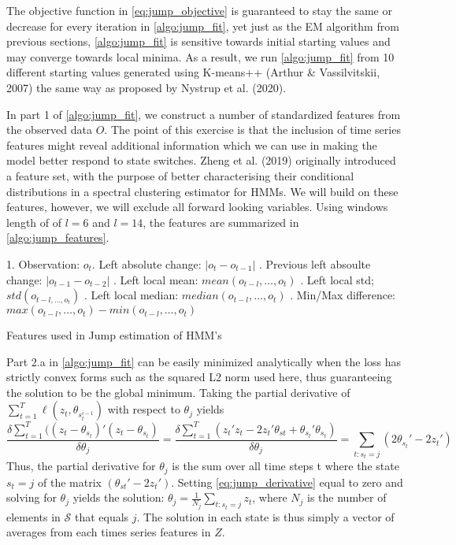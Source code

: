 The objective function in \cref{eq:jump_objective} is guaranteed to stay the same or decrease for every iteration in \cref{algo:jump_fit}, yet just as the EM algorithm from previous sections, \cref{algo:jump_fit} is sensitive towards initial starting values and may converge towards local minima. As a result, we run \cref{algo:jump_fit} from 10 different starting values generated using K-means++ (Arthur \& Vassilvitskii, 2007) the same way as proposed by Nystrup et al. (2020).

In part 1 of \cref{algo:jump_fit}, we construct a number of standardized features from the observed data $O$. The point of this exercise is that the inclusion of time series features might reveal additional information which we can use in making the model better respond to state switches. Zheng et al. (2019) originally introduced a feature set, with the purpose of better characterising their conditional distributions in a spectral clustering estimator for HMMs. We will build on these features, however, we will exclude all forward looking variables. Using windows length of of $l=6$ and $l=14$, the features are summarized in \cref{algo:jump_features}.

\begin{algorithm}[H]

\BlankLine

1. Observation: $o_t$. Left absolute change: $|o_t-o_{t-1}|$ . Previous left absoulte change: $|o_{t-1}-o_{t-2}|$ . Left local mean: $mean(o_{t-l},\ldots,o_{t})$ . Left local std; $std(o_{t-l,\ldots, o_{t}})$ . Left local median: $median(o_{t-l},\ldots,o_{t})$ . Min/Max difference: $max(o_{t-l},\ldots,o_{t}) - min(o_{t-l},\ldots,o_{t})$ \;
\BlankLine



\caption{Features used in Jump estimation of HMM's}
\label{algo:jump_features}
\end{algorithm}

Part 2.a in \cref{algo:jump_fit} can be easily minimized analytically when the loss has strictly convex forms such as the squared L2 norm used here, thus guaranteeing the solution to be the global minimum. Taking the partial derivative of $\sum_{t=1}^T \ell(z_t, \theta_{s_t^{i-1}})$ with respect to $\theta_j$ yields
\begin{equation}
   \frac{\delta \sum_{t=1}^{T} ((z_t-\theta_{s_t})'(z_t-\theta_{s_t}) }{\delta \theta_j}
   = \frac{\delta \sum_{t=1}^T (z_t'z_t - 2z_t'\theta_{st}+ \theta_{s_t}'\theta_{s_t} )}{\delta  \theta_j}
   = \sum_{t:s_t=j} ( 2\theta_{s_t}' - 2z_t' )
\label{eq:jump_derivative}
\end{equation}
Thus, the partial derivative for $\theta_j$ is the sum over all time steps t where the state $s_t=j$ of the matrix $(\theta_{st}'-2z_t')$. Setting \cref{eq:jump_derivative} equal to zero and solving for $\theta_j$ yields the solution: $\theta_j = \frac{1}{N_j} \sum_{t:s_t=j} z_t $, where $N_j$ is the number of elements in $\mathcal{S}$ that equals $j$. The solution in each state is thus simply a vector of averages from each times series features in $Z$.

